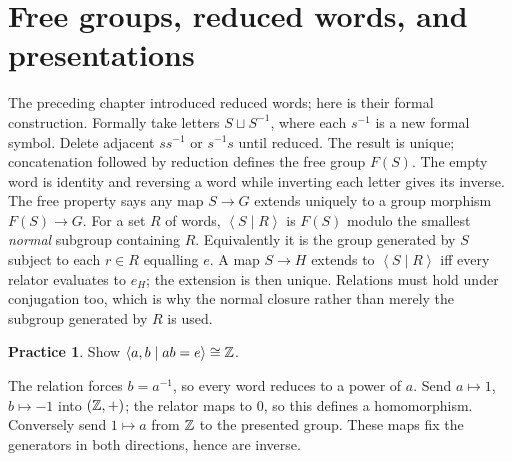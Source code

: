 \documentclass[11pt,openany]{book}
\newcommand{\angles}[1]{\left\langle#1\right\rangle}
\theoremstyle{definition}
\newtheorem{exercise}[theorem]{Practice}
\begin{document}
\section{Free groups, reduced words, and presentations}
The preceding chapter introduced reduced words; here is their formal construction. Formally take letters $S\sqcup S^{-1}$, where each $s^{-1}$ is a new formal symbol. Delete adjacent $ss^{-1}$ or $s^{-1}s$ until reduced. The result is unique; concatenation followed by reduction defines the free group $F(S)$. The empty word is identity and reversing a word while inverting each letter gives its inverse. The free property says any map $S\to G$ extends uniquely to a group morphism $F(S)\to G$.
For a set $R$ of words, $\angles{S\mid R}$ is $F(S)$ modulo the smallest \emph{normal} subgroup containing $R$. Equivalently it is the group generated by $S$ subject to each $r\in R$ equalling $e$. A map $S\to H$ extends to $\angles{S\mid R}$ iff every relator evaluates to $e_H$; the extension is then unique. Relations must hold under conjugation too, which is why the normal closure rather than merely the subgroup generated by $R$ is used.
\begin{exercise}Show $\angles{a,b\mid ab=e}\cong\Z$.\end{exercise}
\begin{solution}The relation forces $b=a^{-1}$, so every word reduces to a power of $a$. Send $a\mapsto1$, $b\mapsto-1$ into $(\mathbb Z,+)$; the relator maps to $0$, so this defines a homomorphism. Conversely send $1\mapsto a$ from $\mathbb Z$ to the presented group. These maps fix the generators in both directions, hence are inverse.\end{solution}
\end{document}
